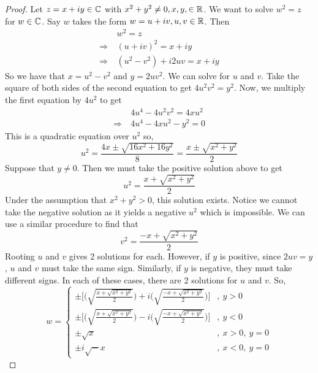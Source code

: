 \documentclass[11pt]{article}
\begin{document}
\begin{proof}
Let $z = x + iy \in \mathbb{C}$ with $x^2 + y^2 \neq 0, x, y, \in \mathbb{R}$. We want to solve
$w^2 = z$ for $w \in \mathbb{C}$. Say $w$ takes the form $w = u + iv, u, v \in \mathbb{R}$. Then
\begin{align*}
& \> w^2 = z\\
\Rightarrow & \> (u+iv)^2 = x + iy\\
\Rightarrow & \> (u^2 - v^2) + i2uv = x + iy
\end{align*}
So we have that $x = u^2 - v^2$ and $y = 2uv^2$. We can solve for $u$ and $v$.
Take the square of both sides of the second equation to get $4u^2v^2 = y^2$.
Now, we multiply the first equation by $4u^2$ to get
\begin{align*}
& \> 4u^4 - 4u^2v^2 = 4xu^2\\
\Rightarrow & \> 4u^4 - 4xu^2 - y^2 = 0
\end{align*}
This is a quadratic equation over $u^2$ so,
\begin{equation*}
u^2 = \frac{4x \pm \sqrt{16x^2 + 16y^2}}{8} = \frac{x \pm \sqrt{x^2 + y^2}}{2}
\end{equation*}
Suppose that $y \neq 0$. Then we must take the positive solution above to get
\begin{equation*}
u^2 = \frac{x + \sqrt{x^2 + y^2}}{2}
\end{equation*}
Under the assumption that $x^2 + y^2 > 0$, this solution exists. Notice we
cannot take the negative solution as it yields a negative $u^2$ which is
impossible. We can use a similar procedure to find that
\begin{equation*}
v^2 = \frac{-x + \sqrt{x^2 + y^2}}{2}
\end{equation*}
Rooting $u$ and $v$ gives 2 solutions for each. However, if $y$ is positive,
since $2uv = y$, $u$ and $v$ must take the same sign. Similarly, if $y$ is
negative, they must take different signs. In each of these cases, there are 2
solutions for $u$ and $v$. So,
\begin{equation*}
w = 
\begin{cases}
\pm \Bigg[ \bigg(\sqrt{\frac{x + \sqrt{x^2 + y^2}}{2}}\bigg) +
i\bigg(\sqrt{\frac{-x + \sqrt{x^2 + y^2}}{2}}\bigg)\Bigg] &, \> y > 0\\
\pm \Bigg[ \bigg(\sqrt{\frac{x + \sqrt{x^2 + y^2}}{2}}\bigg) -
i\bigg(\sqrt{\frac{-x + \sqrt{x^2 + y^2}}{2}}\bigg)\Bigg] &, \> y < 0\\
\pm \sqrt x &, \> x > 0,\> y = 0\\
\pm i\sqrt -x &, \> x < 0,\> y = 0
\end{cases}
\end{equation*}
\end{proof}
\end{document}
